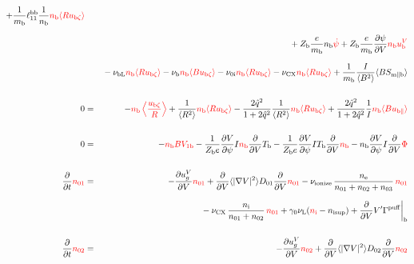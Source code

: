 \documentclass[11pt]{article}
\def\r#1{{\rm#1}}
\def\ave#1{\left\langle#1\right\rangle}
\def\aves#1{\langle#1\rangle}
\def\dd#1#2{\frac{\partial #1}{\partial #2}}
\def\para{\parallel}
\def\ddV{\frac{\partial}{\partial V}}
\def\ddt{\frac{\partial}{\partial t}}
\def\mi{m_\r{i}}
\def\mb{m_\r{b}}
\def\nee{n_\r{e}}
\def\ni{n_\r{i}}
\def\nb{n_\r{b}}
\def\Te{T_\r{e}}
\def\Tb{T_\r{b}}
\def\Zi{Z_\r{i}}
\def\Zb{Z_\r{b}}
\def\uzt#1{u_{\r{#1}\zeta}}
\def\upara#1{u_{\r{#1}\para}}
\def\qhatpara#1{\hat{q}_{\r{#1}\para}}
\def\uV#1{u_\r{#1}^V}
\def\ugV{u_{g}^V}
\def\De{D_\r{e}}
\def\nun#1{\nu_\r{0#1}}
\def\nsup#1{n_\r{#1sup}}
\def\bri{\aves{B^2}\aves{R^2} - I^2}
\def\nna{n_{01}}
\def\nnb{n_{02}}
\def\nnc{n_{03}}
\def\nuL{\nu_\r{L}}
\def\nuCX{\nu_\r{CX}}
\def\nuion{\nu_\r{ionize}}
\def\nub{\nu_\r{b}}
\def\nuOL{\nu_\r{OL}}
\def\nubL{\nu_\r{bL}}
\def\red#1{\textcolor{red}{#1}}
\begin{document}
\begin{eqnarray}
  + \frac{1}{\mb} \ell_{11}^\r{bb} \frac{1}{\nb}  \red{\nb  \aves{R \uzt{b}}}
\nonumber\\[2.5mm]&&{}
%
%
  + \Zb \frac{e}{\mb}              \nb \red{\dot{\psi}}
%
  + \Zb \frac{e}{\mb} \dd{\psi}{V} \red{\nb \uV{b}}
%
\nonumber\\[2.5mm]&&{}
%
  - \nubL  \red{\nb \aves{R \uzt{b}}}
%
  - \nub  \red{\nb \aves{B \uzt{b}}}
%
  - \nun{i} \red{\nb \aves{R \uzt{b}}}
%
  - \nuCX \red{\nb \aves{R \uzt{b}}}
%
%
  + \frac{1}{\mb} \frac{I}{\aves{B^2}} \aves{B S_{\r{m}\para\r{b}}}
%
\\[5mm]
  0 &=&
%
  - \red{\nb \ave{\frac{\uzt{b}}{R}}}
%
  + \frac{1}{\aves{R^2}} \red{\nb \aves{R\uzt{b}}}
%
  - \frac{2\hat{q}^2}{1+2\hat{q}^2} \frac{1}{\aves{R^2}}\red{\nb\aves{R\uzt{b}}}
%
  + \frac{2\hat{q}^2}{1+2\hat{q}^2} \frac{1}{I}\red{\nb \aves{B\upara{b}}}
\\[5mm]
    0 &=&
%
  - \red{\nb BV_{1\r{b}}}
%
  - \frac{1}{\Zb e} \dd{V}{\psi} I \red{\nb} \ddV \Tb 
%
  - \frac{1}{\Zb e} \dd{V}{\psi} I \Tb \ddV \red{\nb}
%
  - \nb \dd{V}{\psi} I \ddV \red{\Phi}
\\[5mm]
  \ddt \red{\nna} &=& 
%
  - \dd{\ugV}{V} \red{\nna}
%
  + \ddV \aves{|\nabla V|^2} D_{01} \ddV \red{\nna}
%
  - \nuion\, \frac{\nee}{\nna + \nnb + \nnc}\, \red{\nna}
%
\nonumber\\[2.5mm]&&{}
  - \nuCX\, \frac{\ni}{\nna + \nnb}\, \red{\nna}
%
  + \gamma_0 \nuL (\red{\ni} - \nsup{i})
%
  + \ddV V' \Gamma^\r{puff}\biggr|_\r{b}
\\[5mm]
  \ddt \red{\nnb} &=& 
%
  - \dd{\ugV}{V} \red{\nnb}
%
  + \ddV \aves{|\nabla V|^2} D_{02} \ddV \red{\nnb}

\end{eqnarray}
\end{document}
